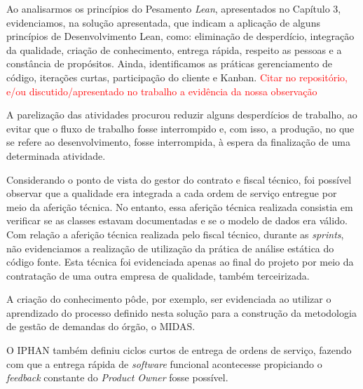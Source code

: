 Ao analisarmos os princípios do Pesamento \textit{Lean}, apresentados no Capítulo 3, evidenciamos, na solução apresentada, que indicam a aplicação de alguns princípios de Desenvolvimento Lean, como: eliminação de desperdício, integração da qualidade, criação de conhecimento, entrega rápida, respeito as pessoas e a constância de propósitos. Ainda, identificamos as práticas gerenciamento de código, iterações curtas, participação do cliente e Kanban. \textcolor{red}{Citar no repositório, e/ou discutido/apresentado no trabalho a evidência da nossa observação}

\textcolor{red}{}

A parelização das atividades procurou reduzir alguns desperdícios de trabalho, ao evitar que o fluxo de trabalho fosse interrompido e, com isso, a produção, no que se refere ao desenvolvimento, fosse interrompida, à espera da finalização de uma determinada atividade. 

Considerando o ponto de vista do gestor do contrato e fiscal técnico, foi possível observar que a qualidade era integrada a cada ordem de serviço entregue por meio da aferição técnica. No entanto, essa aferição técnica realizada consistia em verificar se as classes estavam documentadas e se o modelo de dados era válido. Com relação a aferição técnica realizada pelo fiscal técnico, durante as \textit{sprints}, não evidenciamos a realização de utilização da prática de análise estática do código fonte. Esta técnica foi evidenciada apenas ao final do projeto por meio da contratação de uma outra empresa de qualidade, também terceirizada.

A criação do conhecimento pôde, por exemplo, ser evidenciada ao utilizar o aprendizado do processo definido nesta solução para a construção da metodologia de gestão de demandas do órgão, o MIDAS.

O IPHAN também definiu ciclos curtos de entrega de ordens de serviço, fazendo com que a entrega rápida de \textit{software} funcional acontecesse propiciando o \textit{feedback} constante do \textit{Product Owner} fosse possível. 


